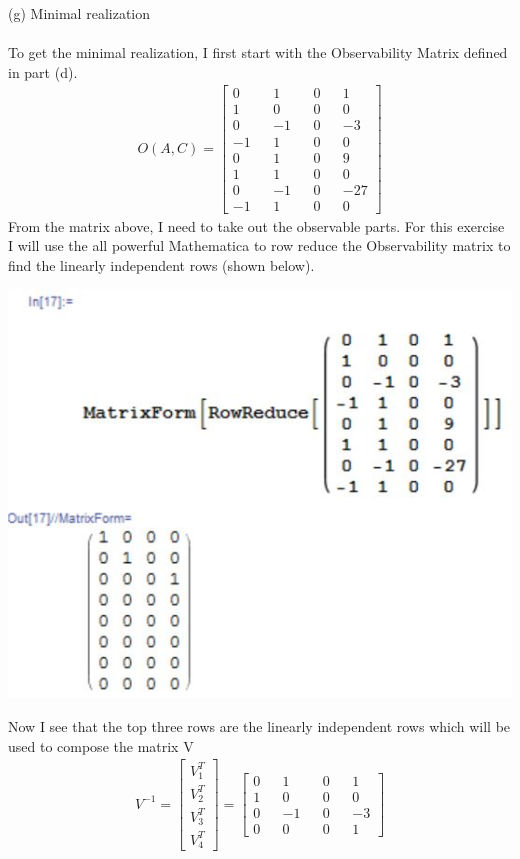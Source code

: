 \documentclass[paper=a4,margin, fontsize=11pt]{scrartcl} %
\numberwithin{equation}{section} %
\numberwithin{figure}{section} %
\numberwithin{table}{section} %
\begin{document}
(g) Minimal realization\\
\\
To get the minimal realization, I first start with the Observability Matrix defined in part (d).
\begin{align*}
O(A,C)=\begin{bmatrix}0 && 1 && 0 && 1\\1 && 0 && 0 && 0\\0 && -1 && 0 && -3\\-1 && 1 && 0 && 0\\0 && 1 && 0 && 9\\1 && 1 && 0 && 0\\0 && -1 && 0 && -27\\-1 && 1 && 0 && 0\end{bmatrix}
\end{align*}
From the matrix above, I need to take out the observable parts. For this exercise I will use the all powerful Mathematica to row reduce the Observability matrix to find the linearly independent rows (shown below).
\begin{center}
{\includegraphics{6g}}
\end{center}
Now I see that the top three rows are the linearly independent rows which will be used to compose the matrix V
\begin{align*}
V^{-1}=\begin{bmatrix}V_1^T\\V_2^T\\V_3^T\\V_4^T\end{bmatrix}=\begin{bmatrix}0 && 1 && 0 && 1\\1 && 0 && 0 && 0\\0 && -1 && 0 && -3\\0 && 0 && 0 && 1\end{bmatrix}
\end{align*}
\end{document}
